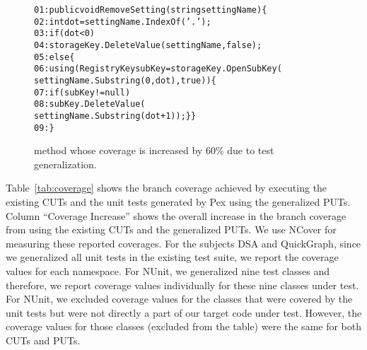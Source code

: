 \begin{figure}[t]
\begin{CodeOut}
\begin{alltt}
01: public void RemoveSetting( string settingName) \{
02: \hspace*{0.05in}int dot = settingName.IndexOf( '.' );
03: \hspace*{0.15in}if ( dot < 0 )
04: \hspace*{0.2in}storageKey.DeleteValue( settingName, false );
05: \hspace*{0.15in}else \{
06: \hspace*{0.2in}using(RegistryKey subKey=storageKey.OpenSubKey(
\hspace*{0.8in}settingName.Substring(0,dot),true))\{
07: \hspace*{0.3in}if ( subKey != null )
08: \hspace*{0.5in}subKey.DeleteValue(
\hspace*{1.0in}settingName.Substring(dot + 1)); \} \}
09: \hspace*{0.02in}\} 
\end{alltt}
\end{CodeOut}
\caption{ method whose coverage is increased by $60\%$ due to test generalization.}
\label{fig:excoverage}
\end{figure}

Table~\ref{tab:coverage} shows the branch coverage achieved by executing the existing CUTs and the unit tests generated by Pex using the generalized PUTs. Column ``Coverage Increase'' shows the overall increase in the branch coverage from using the existing CUTs and the generalized PUTs. We use NCover for measuring these reported coverages. For the subjects DSA and QuickGraph, since we generalized all unit tests in the existing test suite, we report the coverage values for each namespace. For NUnit, we generalized nine test classes and therefore, we report coverage values individually for these nine classes under test. For NUnit, we excluded coverage values for the classes that were covered by the unit tests but were not directly a part of our target code under test. However, the coverage values for those classes (excluded from the table) were the same for both CUTs and PUTs.  

